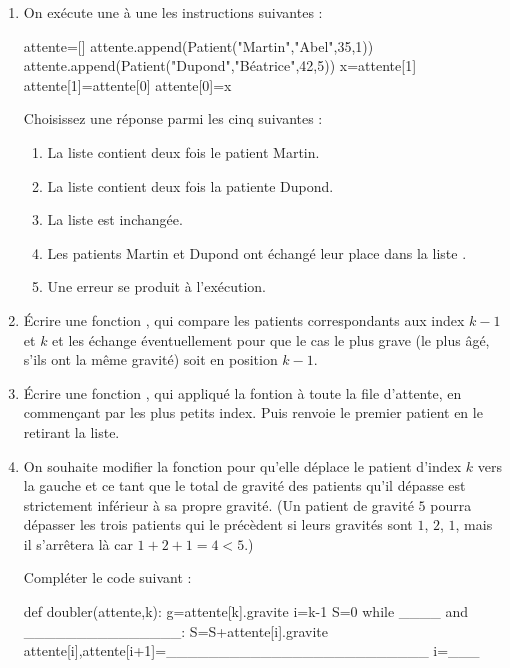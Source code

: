 \documentclass[11pt,a4paper,french,twoside]{PMCours}
\begin{document}
\begin{enumerate}
\begin{enumerate}
    \end{enumerate}
    \item On exécute une à une les instructions suivantes :
\begin{Python}
attente=[]
attente.append(Patient("Martin","Abel",35,1))
attente.append(Patient("Dupond","Béatrice",42,5))
x=attente[1]
attente[1]=attente[0]
attente[0]=x
\end{Python}
    Choisissez une réponse parmi les cinq suivantes :
    \begin{enumerate}
        \item La liste  contient deux fois le patient Martin. 
        \item La liste  contient deux fois la patiente Dupond. 
        \item La liste  est inchangée. 
        \item Les patients Martin et Dupond ont échangé leur place dans la liste . 
        \item Une erreur se produit à l'exécution. 
    \end{enumerate}
    \item Écrire une fonction , qui compare les patients
    correspondants aux index $k-1$ et $k$ et les échange éventuellement pour que
    le cas le plus grave (le plus âgé, s'ils ont la même gravité) soit en position $k-1$.
    \item Écrire une fonction , qui appliqué la fontion 
     à toute la file d'attente, en commençant par les plus petits 
    index. Puis renvoie le premier patient en le retirant la liste.
    \item On souhaite modifier la fonction  pour qu'elle
    déplace le patient d'index $k$ vers la gauche et ce tant que le total de 
    gravité des patients qu'il dépasse est strictement inférieur 
    à sa propre gravité. (Un patient de gravité $5$ pourra dépasser les trois 
    patients qui le précèdent si leurs gravités sont $1$, $2$, $1$, 
    mais il s'arrêtera là car $1+2+1=4<5$.)
    
    Compléter le code suivant :
\begin{Python}
def doubler(attente,k):
    g=attente[k].gravite
    i=k-1
    S=0
    while ____ and _______________:
        S=S+attente[i].gravite
        attente[i],attente[i+1]=_________________________
        i=___
\end{Python}
\end{enumerate}
\end{document}
